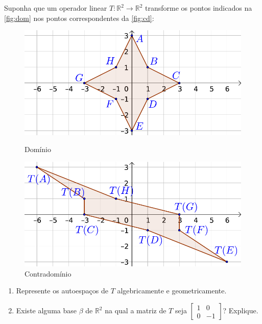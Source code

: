\documentclass[12pt,a4paper]{article}
\newcommand*\R{\mathbb{R}}
\begin{document}
\begin{ExerciseList}
\Exercise[title={3,0}]
Suponha que um operador linear $T: \R^2 \to \R^2$ transforme os pontos indicados na \autoref{fig:dom} nos pontos correspondentes da \autoref{fig:cd}:
\begin{figure}[h]
    \centering
    \begin{minipage}{0.45\textwidth}
        \centering
        \includegraphics[height=0.48\textwidth]{img/prova-4-pro-plano-dom.pdf}
        \caption{Domínio}\label{fig:dom}
    \end{minipage}\hfill
    \begin{minipage}{0.45\textwidth}
        \centering
        \includegraphics[height=0.48\textwidth]{img/prova-4-pro-plano-img.pdf}
        \caption{Contradomínio}\label{fig:cd}
    \end{minipage}
\end{figure}
\begin{enumerate}
\item Represente os autoespaços de $T$ algebricamente e geometricamente.
\item Existe alguma base $\beta$ de $\R^2$ na qual a matriz de $T$ seja
$\begin{bmatrix}
1 & 0 \\0 & -1
\end{bmatrix}$? Explique.
\end{enumerate}

\end{ExerciseList}
\end{document}
